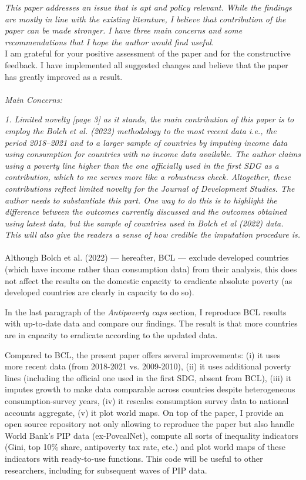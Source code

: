 \documentclass[12pt,english]{article}
\begin{document}
\textit{This paper addresses an issue that is apt and policy relevant. While the findings are mostly in line with the existing literature, I believe that contribution of the paper can be made stronger. I have three main concerns and some recommendations that I hope the author would find useful. }~\\

I am grateful for your positive assessment of the paper and for the constructive feedback. I have implemented all suggested changes and believe that the paper has greatly improved as a result.
~\\ ~\\
 
\textit{Main Concerns:}

\textit{1.	Limited novelty}
\textit{[page 3] as it stands, the main contribution of this paper is to employ the Bolch et al. (2022) methodology to the most recent data i.e., the period 2018–2021 and to a larger sample of countries by imputing income data using consumption for countries with no income data available. The author claims using a poverty line higher than the one officially used in the first SDG as a contribution, which to me serves more like a robustness check. Altogether, these contributions reflect limited novelty for the Journal of Development Studies. The author needs to substantiate this part. One way to do this is to highlight the difference between the outcomes currently discussed and the outcomes obtained using latest data, but the sample of countries used in Bolch et al (2022) data. This will also give the readers a sense of how credible the imputation procedure is.    }~\\

Although Bolch et al. (2022) --- hereafter, BCL --- exclude developed countries (which have income rather than consumption data) from their analysis, this does not affect the results on the domestic capacity to eradicate absolute poverty (as developed countries are clearly in capacity to do so). 

In the last paragraph of the \textit{Antipoverty caps} section, I reproduce BCL results with up-to-date data and compare our findings. The result is that more countries are in capacity to eradicate according to the updated data. 

Compared to BCL, the present paper offers several improvements: (i) it uses more recent data (from 2018-2021 vs. 2009-2010), (ii) it uses additional poverty lines (including the official one used in the first SDG, absent from BCL), (iii) it imputes growth to make data comparable across countries despite heterogeneous consumption-survey years, (iv) it rescales consumption survey data to national accounts aggregate, (v) it plot world maps. On top of the paper, I provide an open source repository not only allowing to reproduce the paper but also handle World Bank's PIP data (ex-PovcalNet), compute all sorts of inequality indicators (Gini, top 10\% share, antipoverty tax rate, etc.) and plot world maps of these indicators with ready-to-use functions. This code will be useful to other researchers, including for subsequent waves of PIP data. 
\end{document}
